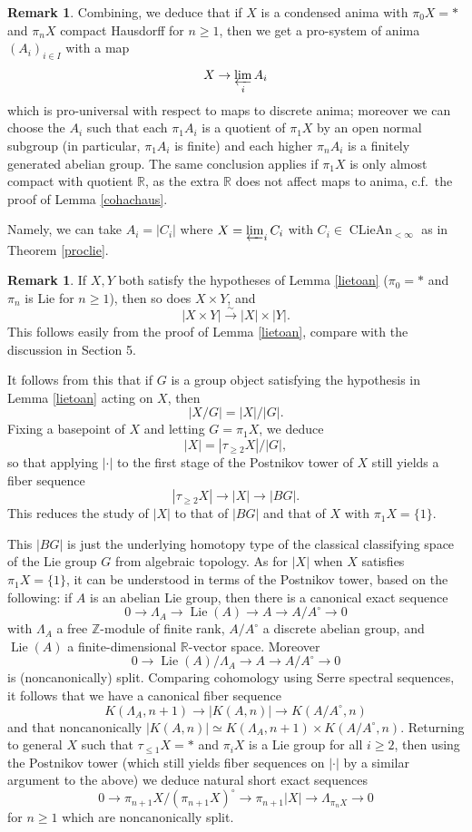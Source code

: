 \documentclass[12pt]{article}
\theoremstyle{definition}
\newtheorem{remark}[theorem]{Remark}
\newcommand{\on}{\operatorname}
\newcommand{\mbb}{\mathbb}
\begin{document}
 \begin{remark}\label{prodiscrete}
 Combining, we deduce that if $X$ is a condensed anima with $\pi_0X=\ast$ and $\pi_nX$ compact Hausdorff for $n\geq 1$, then we get a pro-system of anima $(A_i)_{i\in I}$ with a map
$$X \to \varprojlim_i A_i$$
which is pro-universal with respect to maps to discrete anima; moreover we can choose the $A_i$ such that each $\pi_1 A_i$ is a quotient of $\pi_1X$ by an open normal subgroup (in particular, $\pi_1A_i$ is finite) and each higher $\pi_nA_i$ is a finitely generated abelian group.  The same conclusion applies if $\pi_1X$ is only almost compact with quotient $\mbb{R}$, as the extra $\mbb{R}$ does not affect maps to anima, c.f.\ the proof of Lemma \ref{cohachaus}.

Namely, we can take $A_i = |C_i|$ where $X=\varprojlim_i C_i$ with $C_i\in\on{CLieAn}_{<\infty}$ as in Theorem \ref{proclie}.
\end{remark}

\begin{remark}\label{homotopyofanima}
If $X,Y$ both satisfy the hypotheses of Lemma \ref{lietoan} ($\pi_0=\ast$ and $\pi_n$ is Lie for $n\geq 1$), then so does $X\times Y$, and
$$|X\times Y|\overset{\sim}{\rightarrow} |X|\times |Y|.$$
This follows easily from the proof of Lemma \ref{lietoan}, compare with the discussion in \cite{clausen} Section 5.

It follows from this that if $G$ is a group object satisfying the hypothesis in Lemma \ref{lietoan} acting on $X$, then
$$|X/G|=|X|/|G|.$$
Fixing a basepoint of $X$ and letting $G=\pi_1X$, we deduce
$$|X| = |\tau_{\geq 2}X|/|G|,$$
so that applying $|\cdot|$ to the first stage of the Postnikov tower of $X$ still yields a fiber sequence
$$|\tau_{\geq 2}X| \to |X| \to |BG|.$$
This reduces the study of $|X|$ to that of $|BG|$ and that of $X$ with $\pi_1X=\{1\}$.

This $|BG|$ is just the underlying homotopy type of the classical classifying space of the Lie group $G$ from algebraic topology.  As for $|X|$ when $X$ satisfies $\pi_1X=\{1\}$, it can be understood in terms of the Postnikov tower, based on the following: if $A$ is an abelian Lie group, then there is a canonical exact sequence
$$ 0 \to \Lambda_A \to \on{Lie}(A) \to A \to A/A^\circ \to 0$$
with $\Lambda_A$ a free $\mbb{Z}$-module of finite rank, $A/A^\circ$ a discrete abelian group, and $\on{Lie}(A)$ a finite-dimensional $\mbb{R}$-vector space.  Moreover
$$0\to \on{Lie}(A)/\Lambda_A \to A\to A/A^\circ \to  0$$
is (noncanonically) split.  Comparing cohomology using Serre spectral sequences, it follows that we have a canonical fiber sequence
$$K(\Lambda_A,n+1) \to |K(A,n)| \to K(A/A^\circ,n)$$
and that noncanonically $|K(A,n)|\simeq K(\Lambda_A,n+1) \times K(A/A^\circ,n)$.  Returning to general $X$ such that $\tau_{\leq 1}X=\ast$ and $\pi_iX$ is a Lie group for all $i\geq 2$, then using the Postnikov tower (which still yields fiber sequences on $|\cdot|$ by a similar argument to the above) we deduce natural short exact sequences
$$0 \to \pi_{n+1}X/(\pi_{n+1}X)^\circ \to \pi_{n+1}|X| \to \Lambda_{\pi_nX} \to 0$$
for $n\geq 1$ which are noncanonically split.
\end{remark}
\end{document}
